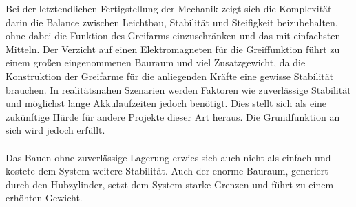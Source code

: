 Bei der letztendlichen Fertigstellung der Mechanik zeigt sich die Komplexität darin die Balance zwischen Leichtbau, Stabilität und Steifigkeit beizubehalten, ohne dabei die Funktion des Greifarms einzuschränken und das mit einfachsten Mitteln. Der Verzicht auf einen Elektromagneten für die Greiffunktion führt zu einem großen eingenommenen Bauraum und viel Zusatzgewicht, da die Konstruktion der Greifarme für die anliegenden Kräfte eine gewisse Stabilität brauchen. In realitätsnahen Szenarien werden Faktoren wie zuverlässige Stabilität und möglichst lange Akkulaufzeiten jedoch benötigt. Dies stellt sich als eine zukünftige Hürde für andere Projekte dieser Art heraus. Die Grundfunktion an sich wird jedoch erfüllt.\\
\\
Das Bauen ohne zuverlässige Lagerung erwies sich auch nicht als einfach und kostete dem System weitere Stabilität. Auch der enorme Bauraum, generiert durch den Hubzylinder, setzt dem System starke Grenzen und führt zu einem erhöhten Gewicht.
